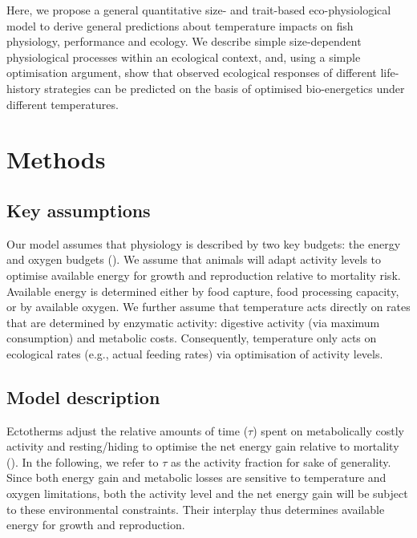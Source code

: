 \documentclass[11pt]{article}\usepackage[]{graphicx}\usepackage[]{color}
\begin{document}
Here, we propose a general quantitative size- and trait-based eco-physiological model to derive general predictions about temperature impacts on fish  physiology, performance and ecology. We describe simple size-dependent physiological processes within an ecological context, and, using a simple optimisation argument, show that observed ecological responses of different life-history strategies can be predicted on the basis of optimised bio-energetics under different temperatures.

\section*{Methods}

\subsection*{Key assumptions}

Our model assumes that physiology is described by two key budgets: the energy and oxygen budgets (\cite{holt_climate_2015,holt_climate_2014}). We assume that animals will adapt activity levels to optimise available energy for growth and reproduction relative to mortality risk. Available energy is determined either by food capture, food processing capacity, or by available oxygen. We further assume that temperature acts directly on rates that are determined by enzymatic activity: digestive activity (via maximum consumption) and metabolic costs. Consequently, temperature only acts on ecological rates (e.g., actual feeding rates) via optimisation of activity levels.

\subsection*{Model description}
Ectotherms adjust the relative amounts of time ($\tau$) spent on metabolically costly activity and resting/hiding to optimise the net energy gain relative to mortality (\cite{gilliam_habitat_1987}). In the following, we refer to $\tau$ as the activity fraction for sake of generality.   Since both energy gain and metabolic losses are sensitive to temperature and oxygen limitations, both the activity level and the net energy gain will be subject to these environmental constraints. Their interplay thus determines available energy for growth and reproduction.
\end{document}
